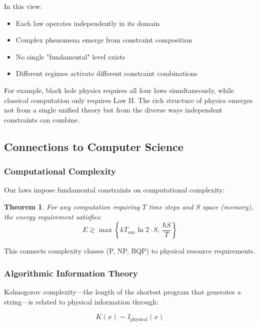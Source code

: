 \documentclass[11pt,a4paper]{article}
\theoremstyle{plain}
\newtheorem{theorem}{Theorem}[section]
\theoremstyle{definition}
\theoremstyle{remark}
\begin{document}
In this view:
\begin{itemize}[leftmargin=*]
\item Each law operates independently in its domain
\item Complex phenomena emerge from constraint composition
\item No single "fundamental" level exists
\item Different regimes activate different constraint combinations
\end{itemize}

For example, black hole physics requires all four laws simultaneously, while classical computation only requires Law II. The rich structure of physics emerges not from a single unified theory but from the diverse ways independent constraints can combine.

\subsection{Connections to Computer Science}

\subsubsection{Computational Complexity}

Our laws impose fundamental constraints on computational complexity:

\begin{theorem}
For any computation requiring $T$ time steps and $S$ space (memory), the energy requirement satisfies:
\begin{equation}
E \gtrsim \max\left\{kT_{\text{env}}\ln 2\cdot S,\, \frac{\hbar S}{T}\right\}
\end{equation}
\end{theorem}

This connects complexity classes (P, NP, BQP) to physical resource requirements.

\subsubsection{Algorithmic Information Theory}

Kolmogorov complexity—the length of the shortest program that generates a string—is related to physical information through:

\begin{equation}
K(x) \sim I_{\text{physical}}(x)
\end{equation}
\end{document}
